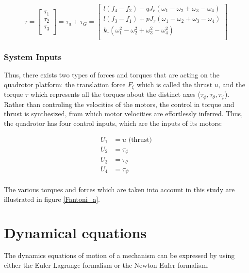 \documentclass{thesisreport}
\begin{document}
\begin{equation}\label{total_torque_equation}
\tau = \begin{bmatrix}
\tau_1\\
\tau_2\\
\tau_3\\
\end{bmatrix} = \tau_a + \tau_G = \begin{bmatrix}
l(f_4-f_2) - qJ_r(\omega_1-\omega_2+\omega_3-\omega_4)\\
l(f_3-f_1) + pJ_r(\omega_1-\omega_2+\omega_3-\omega_4)\\
k_{\tau}(\omega_1^2-\omega_2^2+\omega_3^2-\omega_4^2)\\
\end{bmatrix}
\end{equation}

\subsubsection*{System Inputs}

Thus, there exists two types of forces and torques that are acting on the quadrotor platform: the translation force $F_{\xi}$ which is called the thrust $u$, and the torque $\tau$ which represents all the torques about the distinct axes ($\tau_{\phi}, \tau_{\theta}, \tau_{\psi} $). \\
Rather than controling the velocities of the motors, the control in torque and thrust is synthesized, from which motor velocities are effortlessly inferred. Thus, the quadrotor has four control inputs, which are the inputs of its motors:

\begin{align*}
U_1 &= u \text{ (thrust)} \\
U_2 &= \tau_{\phi}\\
U_3 &= \tau_{\theta}\\
U_4 &= \tau_{\psi}\\
\end{align*}

The various torques and forces which are taken into account in this study are illustrated in figure \ref{Fantoni_a}.

\newpage

\section{Dynamical equations}

The dynamics equations of motion of a mechanism can be expressed by using either the Euler-Lagrange formalism or the Newton-Euler formalism.
\end{document}
